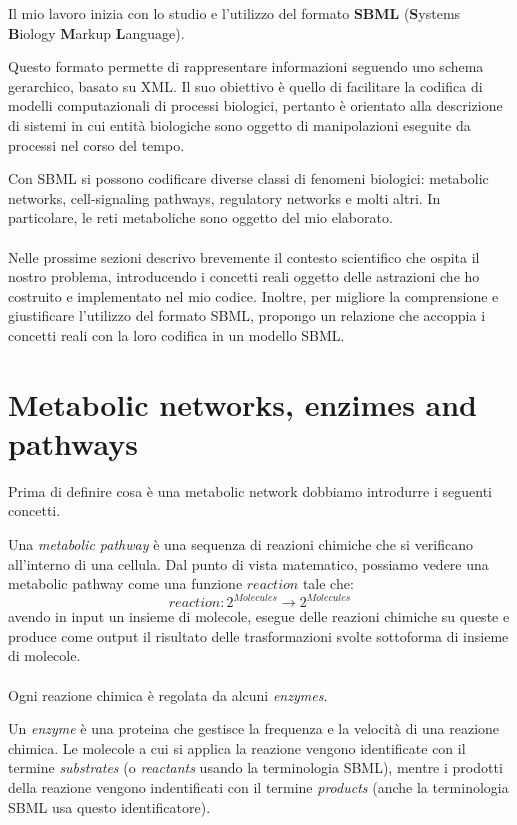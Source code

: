 
Il mio lavoro inizia con lo studio e l'utilizzo del formato
\textbf{SBML} (\textbf{S}ystems \textbf{B}iology \textbf{M}arkup 
\textbf{L}anguage). 

Questo formato permette di rappresentare informazioni seguendo uno
schema gerarchico, basato su XML. Il suo obiettivo \`e quello di
facilitare la codifica di modelli computazionali di processi
biologici, pertanto \`e orientato alla descrizione di sistemi in cui
entit\`a biologiche sono oggetto di manipolazioni eseguite da processi
nel corso del tempo.

Con SBML si possono codificare diverse classi di fenomeni biologici:
metabolic networks, cell-signaling pathways, regulatory networks e
molti altri. In particolare, le reti metaboliche sono oggetto del mio
elaborato.
\\\\
Nelle prossime sezioni descrivo brevemente il contesto scientifico che
ospita il nostro problema, introducendo i concetti reali oggetto delle
astrazioni che ho costruito e implementato nel mio codice. Inoltre,
per migliore la comprensione e giustificare l'utilizzo del formato
SBML, propongo un relazione che accoppia i concetti reali con la loro
codifica in un modello SBML.

\section{Metabolic networks, enzimes and pathways}

Prima di definire cosa \`e una metabolic network dobbiamo introdurre i
seguenti concetti. 

Una \emph{metabolic pathway} \`e una sequenza di reazioni chimiche che
si verificano all'interno di una cellula. Dal punto di vista
matematico, possiamo vedere una metabolic pathway come una funzione
$reaction$ tale che:
\begin{displaymath}
reaction : 2^{Molecules} \rightarrow 2^{Molecules}
\end{displaymath}
avendo in input un insieme di molecole, esegue delle reazioni chimiche su
queste e produce come output il risultato delle trasformazioni svolte
sottoforma di insieme di molecole.
\\\\
Ogni reazione chimica \`e regolata da alcuni \emph{enzymes}. 

Un \emph{enzyme} \`e una proteina che gestisce la frequenza e la
velocit\`a di una reazione chimica. Le molecole a cui si applica la
reazione vengono identificate con il termine \emph{substrates} (o
\emph{reactants} usando la terminologia SBML), mentre i prodotti della
reazione vengono indentificati con il termine \emph{products} (anche la
terminologia SBML usa questo identificatore).

